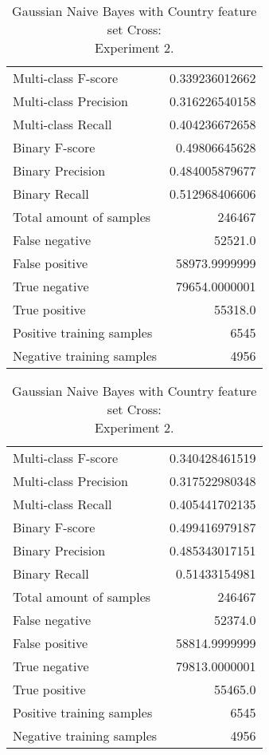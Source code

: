 \begin{table}[H]
\begin{minipage}{0.5\textwidth}
\caption{Gaussian Naive Bayes with Country feature set Cross: \\Experiment 1.}
\centering
\begin{tabular}{l r}
\toprule
Multi-class F-score & 0.339236012662 \\
Multi-class Precision & 0.316226540158 \\
Multi-class Recall & 0.404236672658 \\
\midrule
Binary F-score & 0.49806645628 \\
Binary Precision & 0.484005879677 \\
Binary Recall & 0.512968406606 \\
\midrule
Total amount of samples & 246467 \\
False negative & 52521.0 \\
False positive & 58973.9999999 \\
True negative & 79654.0000001 \\
True positive & 55318.0 \\
\midrule
Positive training samples & 6545 \\
Negative training samples & 4956 \\
\bottomrule
\end{tabular}
\end{minipage}
\hfillx
\begin{minipage}{0.5\textwidth}
\caption{Gaussian Naive Bayes with Country feature set Cross: \\Experiment 2.}
\centering
\begin{tabular}{l r}
\toprule
Multi-class F-score & 0.340428461519 \\
Multi-class Precision & 0.317522980348 \\
Multi-class Recall & 0.405441702135 \\
\midrule
Binary F-score & 0.499416979187 \\
Binary Precision & 0.485343017151 \\
Binary Recall & 0.51433154981 \\
\midrule
Total amount of samples & 246467 \\
False negative & 52374.0 \\
False positive & 58814.9999999 \\
True negative & 79813.0000001 \\
True positive & 55465.0 \\
\midrule
Positive training samples & 6545 \\
Negative training samples & 4956 \\
\bottomrule
\end{tabular}
\end{minipage}
\end{table}
